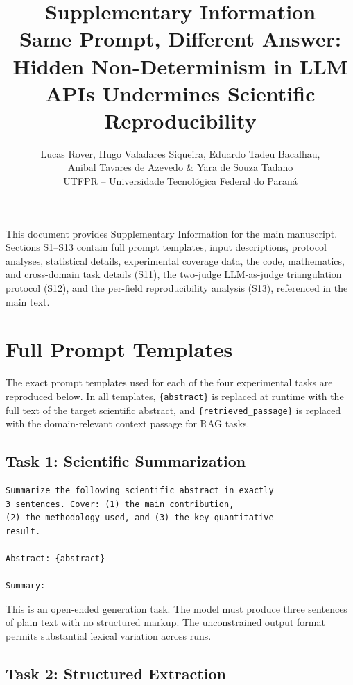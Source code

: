 \documentclass[11pt]{article}
\title{\textbf{Supplementary Information}\\[6pt]
Same Prompt, Different Answer:\\Hidden Non-Determinism in LLM APIs Undermines Scientific Reproducibility}
\author{Lucas Rover, Hugo Valadares Siqueira, Eduardo Tadeu Bacalhau,\\ Anibal Tavares de Azevedo \& Yara de Souza Tadano\\
\small UTFPR -- Universidade Tecnol\'ogica Federal do Paran\'a}
\date{}
\begin{document}
\maketitle

\noindent This document provides Supplementary Information for the main manuscript. Sections S1--S13 contain full prompt templates, input descriptions, protocol analyses, statistical details, experimental coverage data, the code, mathematics, and cross-domain task details (S11), the two-judge LLM-as-judge triangulation protocol (S12), and the per-field reproducibility analysis (S13), referenced in the main text.

\tableofcontents
\newpage


\section{Full Prompt Templates}
\label{sec:s1}

The exact prompt templates used for each of the four experimental tasks are reproduced below. In all templates, \texttt{\{abstract\}} is replaced at runtime with the full text of the target scientific abstract, and \texttt{\{retrieved\_passage\}} is replaced with the domain-relevant context passage for RAG tasks.

\subsection{Task 1: Scientific Summarization}

\begin{lstlisting}[caption={Prompt template for Task 1 (scientific summarization).}]
Summarize the following scientific abstract in exactly
3 sentences. Cover: (1) the main contribution,
(2) the methodology used, and (3) the key quantitative
result.

Abstract: {abstract}

Summary:
\end{lstlisting}

\noindent This is an open-ended generation task. The model must produce three sentences of plain text with no structured markup. The unconstrained output format permits substantial lexical variation across runs.

\subsection{Task 2: Structured Extraction}
\end{document}
